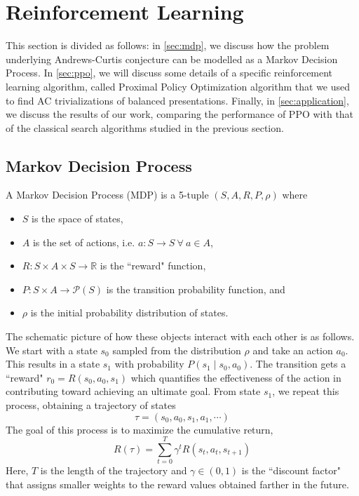 
\section{Reinforcement Learning}\label{sec:rl}



This section is divided as follows: in \autoref{sec:mdp}, we discuss how the problem underlying Andrews-Curtis conjecture can be modelled as a Markov Decision Process. In \autoref{sec:ppo}, we will discuss some details of a specific reinforcement learning algorithm, called Proximal Policy Optimization algorithm that we used to find AC trivializations of balanced presentations. Finally, in \autoref{sec:application}, we discuss the results of our work, comparing the performance of PPO with that of the classical search algorithms studied in the previous section. 

\subsection{Markov Decision Process} \label{sec:mdp}

A Markov Decision Process (MDP) is a 5-tuple $(S, A, R, P, \rho)$ where 
\begin{itemize}
	\item $S$ is the space of states, 
	\item $A$ is the set of actions, i.e. $a \colon S \to S \ \forall \ a \in A$, 
	\item $R \colon S \times A \times S \to \mathbb{R}$ is the ``reward" function, 
	\item $P \colon S \times A \to \mathcal{P}(S)$ is the transition probability function, and 
	\item $\rho$ is the initial probability distribution of states. 
\end{itemize}

The schematic picture of how these objects interact with each other is as follows. We start with a state $s_0$ sampled from the distribution $\rho$ and take an action $a_0$. This results in a state $s_1$ with probability $P(s_1 \mid s_0, a_0) $. The transition gets a ``reward" $r_0 = R(s_0, a_0, s_1)$ which quantifies the effectiveness of the action in contributing toward achieving an ultimate goal. From state $s_1$, we repeat this process, obtaining a trajectory of states
\[
\tau = \left( s_0, a_0, s_1, a_1, \cdots \right)
\]
The goal of this process is to maximize the cumulative return,
\[
R(\tau) = \sum\limits_{t=0}^{T} \gamma^t R(s_t, a_t, s_{t+1})
\]
Here, $T$ is the length of the trajectory and $\gamma \in \left(0, 1 \right)$ is the ``discount factor" that assigns smaller weights to the reward values obtained farther in the future. 
\newline

